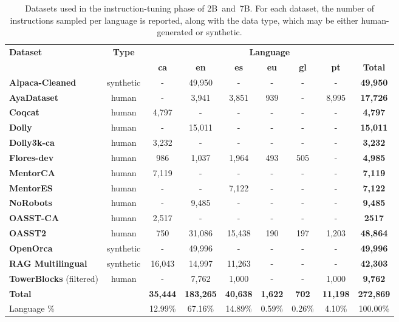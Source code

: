 \begin{table}[ht!]
\centering
\begin{adjustbox}{width=\textwidth,center=\textwidth}
\begin{tabular}{@{}p{2.5cm}cccccccc@{}}
\toprule
\multirow{2}{*}{\textbf{Dataset}} & \multirow{2}{*}{\textbf{Type}} & \multicolumn{7}{c}{\textbf{Language}} \\  \cmidrule(l){3-9} 
 &  & \textbf{ca} & \textbf{en} & \textbf{es} & \textbf{eu} & \textbf{gl} & \textbf{pt} & \textbf{Total} \\ \midrule
\textbf{Alpaca-Cleaned} & synthetic & - & 49,950 & - & - & - & - & \textbf{49,950} \\
\textbf{AyaDataset} & human & - & 3,941 & 3,851 & 939 & - & 8,995 & \textbf{17,726} \\
\textbf{Coqcat} & human & 4,797 & - & - & - & - & - & \textbf{4,797} \\
\textbf{Dolly} & human & - & 15,011 & - & - & - & - & \textbf{15,011} \\
\textbf{Dolly3k-ca} & human & 3,232 & - & - & - & - & - & \textbf{3,232} \\
\textbf{Flores-dev} & human & 986 & 1,037 & 1,964 & 493 & 505 & - & \textbf{4,985} \\
\textbf{MentorCA} & human & 7,119 & - & - & - & - & - & \textbf{7,119} \\
\textbf{MentorES} & human & - & - & 7,122 & - & - & - & \textbf{7,122} \\
\textbf{NoRobots} & human & - & 9,485 & - & - & - & - & \textbf{9,485} \\
\textbf{OASST-CA} & human & 2,517 & - & - & - & - & - & \textbf{2517} \\
\textbf{OASST2} & human & 750 & 31,086 & 15,438 & 190 & 197 & 1,203 & \textbf{48,864} \\
\textbf{OpenOrca} & synthetic & - & 49,996 & - & - & - & - & \textbf{49,996} \\
\textbf{RAG Multilingual} & synthetic & 16,043 & 14,997 & 11,263 & - & - & - & \textbf{42,303} \\
\textbf{TowerBlocks} (filtered) & human & - & 7,762 & 1,000 & - & - & 1,000 & \textbf{9,762} \\
\midrule
\textbf{Total}&  & \textbf{35,444} & \textbf{183,265} & \textbf{40,638} & \textbf{1,622} & \textbf{702} & \textbf{11,198} & \textbf{272,869}\\
Language \% &   & 12.99\% & 67.16\% & 14.89\% & 0.59\% & 0.26\% & 4.10\% & 100.00\%\\
\bottomrule
\end{tabular}
\end{adjustbox}
\caption{Datasets used in the instruction-tuning phase of \SalamandraInstructed{} \mbox{2B and 7B}. For each dataset, the number of instructions sampled per language is reported, along with the data type, which may be either human-generated or synthetic.}
\label{tab:instruction_data}
\end{table}
